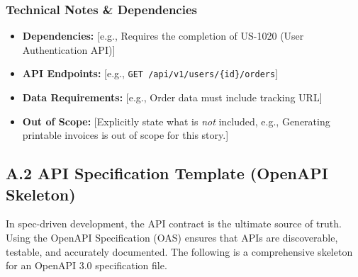 \documentclass[
  11pt,
  openany,
  oneside]{book}
\providecommand{\tightlist}{%
  \setlength{\itemsep}{0pt}\setlength{\parskip}{0pt}}
\begin{document}
\subsubsection{Technical Notes \&
Dependencies}\label{technical-notes-dependencies}

\begin{itemize}
\tightlist
\item
  \textbf{Dependencies:} {[}e.g., Requires the completion of US-1020
  (User Authentication API){]}
\item
  \textbf{API Endpoints:} {[}e.g.,
  \texttt{GET\ /api/v1/users/\{id\}/orders}{]}
\item
  \textbf{Data Requirements:} {[}e.g., Order data must include tracking
  URL{]}
\item
  \textbf{Out of Scope:} {[}Explicitly state what is \emph{not}
  included, e.g., Generating printable invoices is out of scope for this
  story.{]}
\end{itemize}

\bigskip

\subsection{A.2 API Specification Template (OpenAPI
Skeleton)}\label{a.2-api-specification-template-openapi-skeleton}

In spec-driven development, the API contract is the ultimate source of
truth. Using the OpenAPI Specification (OAS) ensures that APIs are
discoverable, testable, and accurately documented. The following is a
comprehensive skeleton for an OpenAPI 3.0 specification file.
\end{document}

